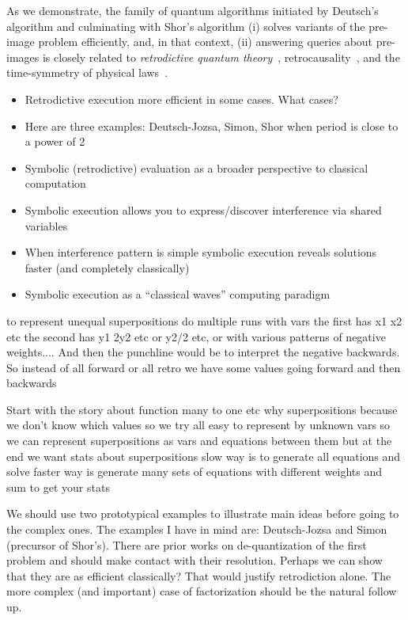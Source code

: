 \documentclass{article}
\begin{document}
\begin{refsection}
As we demonstrate, the family of quantum algorithms initiated by
Deutsch's algorithm and culminating with Shor's algorithm (i) solves
variants of the pre-image problem efficiently, and, in that context,
(ii) answering queries about pre-images is closely related to
\emph{retrodictive quantum theory}~\cite{sym13040586},
retrocausality~\cite{Aharonov2008}, and the time-symmetry of physical
laws~\cite{RevModPhys.27.179}.


\begin{itemize}
\item Retrodictive execution more efficient in some cases. What cases?
\item Here are three examples: Deutsch-Jozsa, Simon, Shor when period
  is close to a power of 2
\item Symbolic (retrodictive) evaluation as a broader perspective to classical computation
\item Symbolic execution allows you to express/discover interference via shared variables
\item When interference pattern is simple symbolic execution reveals
  solutions faster (and completely classically)
\item Symbolic execution as a “classical waves” computing paradigm
\end{itemize}


to represent unequal superpositions do multiple runs with vars the
first has x1 x2 etc the second has y1 2y2 etc or y2/2 etc, or with
various patterns of negative weights.... And then the punchline would
be to interpret the negative backwards. So instead of all forward or
all retro we have some values going forward and then backwards

Start with the story about function many to one etc why superpositions
because we don’t know which values so we try all easy to represent by
unknown vars so we can represent superpositions as vars and equations
between them but at the end we want stats about superpositions slow
way is to generate all equations and solve faster way is generate many
sets of equations with different weights and sum to get your stats



We should use two prototypical examples to illustrate main ideas
before going to the complex ones. The examples I have in mind are:
Deutsch-Jozsa and Simon (precursor of Shor's). There are prior works
on de-quantization of the first problem and should make contact with
their resolution. Perhaps we can show that they are as efficient
classically? That would justify retrodiction alone. The more complex
(and important) case of factorization should be the natural follow up.


\end{refsection}
\end{document}
